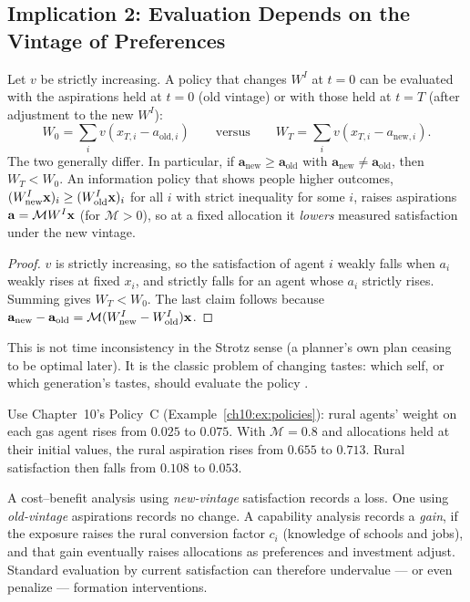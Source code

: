 \documentclass[../structural_economics_book.tex]{subfiles}
\begin{document}
\subsection{Implication 2: Evaluation Depends on the Vintage of Preferences}

\begin{proposition}\label{ch12:prop:time_inconsistent}
Let $v$ be strictly increasing. A policy that changes $W^I$ at $t = 0$ can be evaluated with the aspirations held at $t = 0$ (old vintage) or with those held at $t = T$ (after adjustment to the new $W^I$):
\begin{equation}\label{ch12:eq:time_inconsistent}
W_0 = \sum_i v(x_{T,i} - a_{\text{old},i}) \qquad \text{versus} \qquad W_T = \sum_i v(x_{T,i} - a_{\text{new},i}).
\end{equation}
The two generally differ. In particular, if $\mathbf{a}_{\text{new}} \geq \mathbf{a}_{\text{old}}$ with $\mathbf{a}_{\text{new}} \neq \mathbf{a}_{\text{old}}$, then $W_T < W_0$. An information policy that shows people higher outcomes, $(W^I_{\text{new}}\mathbf{x})_i \ge (W^I_{\text{old}}\mathbf{x})_i$ for all $i$ with strict inequality for some $i$, raises aspirations $\mathbf{a} = \mathcal{M}W^I\mathbf{x}$ (for $\mathcal{M} > 0$), so at a fixed allocation it \textit{lowers} measured satisfaction under the new vintage.
\end{proposition}

\begin{proof}
$v$ is strictly increasing, so the satisfaction of agent $i$ weakly falls when $a_i$ weakly rises at fixed $x_i$, and strictly falls for an agent whose $a_i$ strictly rises. Summing gives $W_T < W_0$. The last claim follows because $\mathbf{a}_{\text{new}} - \mathbf{a}_{\text{old}} = \mathcal{M}(W^I_{\text{new}} - W^I_{\text{old}})\mathbf{x}$.
\end{proof}

This is not time inconsistency in the Strotz sense (a planner's own plan ceasing to be optimal later). It is the classic problem of changing tastes: which self, or which generation's tastes, should evaluate the policy \citep{weizsacker1971notes,hammond1976endogenous}.

\begin{example}\label{ch12:ex:education_policy}
Use Chapter~10's Policy~C (Example~\ref{ch10:ex:policies}): rural agents' weight on each gas agent rises from $0.025$ to $0.075$. With $\mathcal{M} = 0.8$ and allocations held at their initial values, the rural aspiration rises from $0.655$ to $0.713$. Rural satisfaction then falls from $0.108$ to $0.053$.

A cost--benefit analysis using \textit{new-vintage} satisfaction records a loss. One using \textit{old-vintage} aspirations records no change. A capability analysis records a \textit{gain}, if the exposure raises the rural conversion factor $c_i$ (knowledge of schools and jobs), and that gain eventually raises allocations as preferences and investment adjust. Standard evaluation by current satisfaction can therefore undervalue --- or even penalize --- formation interventions.
\end{example}
\end{document}

